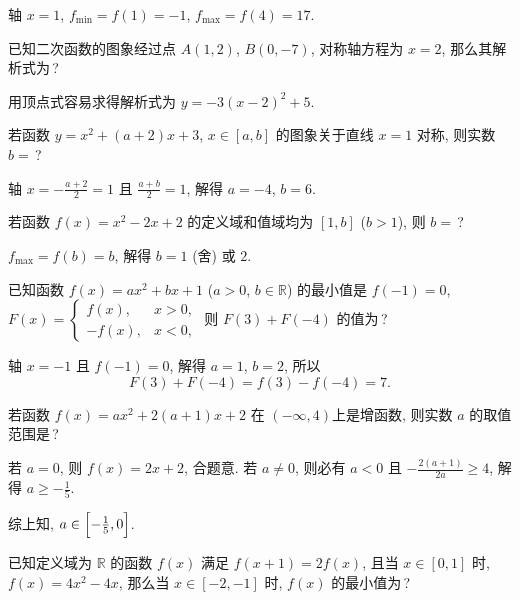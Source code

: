   \beginsolution
    轴 $x=1$, $f_{\min}=f(1)=-1$, $f_{\max}=f(4)=17$.
  \endsolution
  
  \begin{exercise}
    已知二次函数的图象经过点 $A(1,2)$, $B(0,-7)$, 对称轴方程为 $x=2$,
    那么其解析式为\,?
  \end{exercise}

  \beginsolution
    用顶点式容易求得解析式为 $y=-3(x-2)^2+5$.
  \endsolution
  
  \begin{exercise}
    若函数 $y=x^2 +(a+2)x+3$, $x\in [a,b]$ 的图象关于直线 $x=1$ 对称,
    则实数 $b=$\,?
  \end{exercise}

  \beginsolution
    轴 $x=-\frac{a+2}2=1$ 且 $\frac{a+b}2=1$, 解得 $a=-4$, $b=6$.
  \endsolution
  
  \begin{exercise}
    若函数 $f(x)=x^2 -2x+2$ 的定义域和值域均为 $[1,b]$ ($b>1$), 则 $b=$\,?
  \end{exercise}

  \beginsolution
    $f_{\max}=f(b)=b$, 解得 $b=1$ (舍) 或 $2$.
  \endsolution
  
  \begin{exercise}
    已知函数 $f(x)=ax^2 +bx+1$ ($a>0$, $b\in \mathbb{R}$) 
    的最小值是 $f(-1)=0$, $F(x)=\begin{cases}
      f(x), & x>0,\\ -f(x), & x<0,\end{cases}$
    则 $F(3)+F(-4)$ 的值为\,?
  \end{exercise}

  \beginsolution
    轴 $x=-1$ 且 $f(-1)=0$, 解得 $a=1$, $b=2$, 所以 
    \[F(3)+F(-4)= f(3)-f(-4)=7.\]
  \endsolution
  
  \begin{exercise}
    若函数 $f(x)=ax^2 +2(a+1)x+2$ 在 $(-\infty,4) $上是增函数,
    则实数 $a$ 的取值范围是\,?
  \end{exercise}

  \beginsolution
    若 $a=0$, 则 $f(x)=2x+2$, 合题意. 若 $a\neq0$, 则必有 $a<0$ 且 $-\frac{2(a+1)}{2a}\geqslant 4$, 解得 $a\geqslant -\frac15$.
    
    综上知, $a\in\Bigl[-\frac15,0\Bigr]$.
  \endsolution
  
  \begin{exercise}
    已知定义域为 $\mathbb{R}$ 的函数 $f(x)$ 满足 $f(x+1)=2f(x)$,
    且当 $x\in [0,1]$ 时, $f(x)=4x^2 -4x$, 那么当 $x\in [-2,-1]$ 时,
    $f(x)$ 的最小值为\,?
  \end{exercise}

